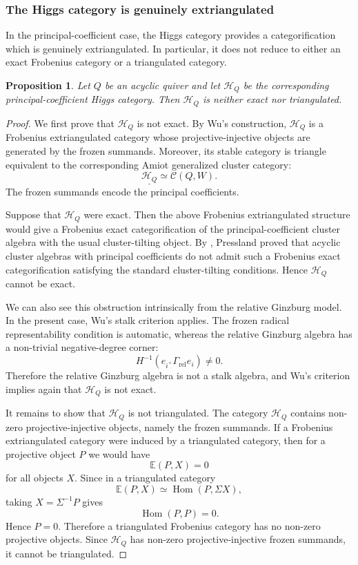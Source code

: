 \documentclass[11pt,reqno]{article}
\numberwithin{equation}{section}
\newtheorem{proposition}[proposition]{Proposition}
\theoremstyle{definition}
\begin{document}
\subsubsection{The Higgs category is genuinely extriangulated}
\label{subsec}

In the principal-coefficient case, the Higgs category provides a
categorification which is genuinely extriangulated.  In particular, it
does not reduce to either an exact Frobenius category or a triangulated
category.

\begin{proposition}
\label{prop}
Let $Q$ be an acyclic quiver and let $\mathcal H_Q$ be the corresponding
principal-coefficient Higgs category. Then $\mathcal H_Q$ is neither exact
nor triangulated.
\end{proposition}

\begin{proof}
We first prove that $\mathcal H_Q$ is not exact.
By Wu's construction, $\mathcal H_Q$ is a Frobenius extriangulated
category whose projective-injective objects are generated by the frozen
summands. Moreover, its stable category is triangle equivalent to the
corresponding Amiot generalized cluster category:
$$
\underline{\mathcal H_Q}\simeq \mathcal C(Q,W).
$$
The frozen summands encode the principal coefficients.

Suppose that $\mathcal H_Q$ were exact. Then the above Frobenius
extriangulated structure would give a Frobenius exact categorification of
the principal-coefficient cluster algebra with the usual cluster-tilting
object. By \cite{PresslandPrincipal}, Pressland proved that acyclic cluster algebras with
principal coefficients do not admit such a Frobenius exact
categorification satisfying the standard cluster-tilting conditions. Hence $\mathcal H_Q$ cannot be exact.

We can also see this obstruction intrinsically from the relative
Ginzburg model. In the present case, Wu's stalk criterion applies. The
frozen radical representability condition is automatic, whereas the
relative Ginzburg algebra has a non-trivial negative-degree corner:
$$
H^{-1}(e_{i^+}\Gamma_{\mathrm{rel}}e_i)\neq 0 .
$$
Therefore the relative Ginzburg algebra is not a stalk algebra, and Wu's
criterion implies again that $\mathcal H_Q$ is not exact.

It remains to show that $\mathcal H_Q$ is not triangulated.  The category
$\mathcal H_Q$ contains non-zero projective-injective objects, namely the
frozen summands.  If a Frobenius extriangulated category were induced by
a triangulated category, then for a projective object $P$ we would have
$$
\mathbb E(P,X)=0
$$
for all objects $X$.  Since in a triangulated category
$$
\mathbb E(P,X)\simeq \operatorname{Hom}(P,\Sigma X),
$$
taking $X=\Sigma^{-1}P$ gives
$$
\operatorname{Hom}(P,P)=0.
$$
Hence $P=0$.  Therefore a triangulated Frobenius category has no
non-zero projective objects.  Since $\mathcal H_Q$ has non-zero
projective-injective frozen summands, it cannot be triangulated.
\end{proof}
\end{document}
